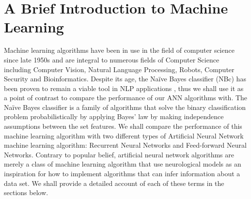 \documentclass{article}
\begin{document}
\section{A Brief Introduction to Machine Learning }
Machine learning algorithms have been in use in the field of computer science since late 1950s and are integral to numerous fields of Computer Science including Computer Vision, Natural Language Processing, Robots, Computer Security and Bioinformatics. Despite its age, the Naïve Bayes classifier (NBc) has been proven to remain a viable tool in NLP applications \citep{russell2003artificial} \citep{AnderewNG} , thus we shall use it as a point of contrast to compare the performance of our ANN algorithms with. The Naïve Bayes classifier is a family of algorithms that solve the binary classification problem probabilistically by applying Bayes' law by making independence assumptions between the set features. We shall compare the performance of this machine learning algorithm with two different types of Artificial Neural Network machine learning algorithm: Recurrent Neural Networks and Feed-forward Neural Networks. Contrary to popular belief, artificial neural network algorithms are merely a class of machine learning algorithm that use neurological models as an inspiration for how to implement algorithms that can infer information about a data set. We shall provide a detailed account of each of these terms in the sections below.
\end{document}
